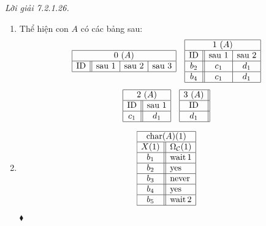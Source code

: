 \noindent\textit{Lời giải 7.2.1.26.}\keepwithnext
\begin{enumerate}[label=\alph*.]
\item Thể hiện con $A$ có các bảng sau:
\[
\begin{gathered}
\begin{array}{|c||c|c|c|}\hline\multicolumn{4}{|c|}{0\ (A)}\\\hline\text{ID}&\text{sau 1}&\text{sau 2}&\text{sau 3}\\\hline\end{array}\quad
\begin{array}{|c||c|c|}\hline\multicolumn{3}{|c|}{1\ (A)}\\\hline\text{ID}&\text{sau 1}&\text{sau 2}\\\hline
b_2&c_1&d_1\\\hline b_4&c_1&d_1\\\hline\end{array}\\[1ex]
\begin{array}{|c||c|}\hline\multicolumn{2}{|c|}{2\ (A)}\\\hline\text{ID}&\text{sau 1}\\\hline c_1&d_1\\\hline\end{array}\quad
\begin{array}{|c||}\hline3\ (A)\\\hline\text{ID}\\\hline d_1\\\hline\end{array}
\end{gathered}
\]
\item
\[
\begin{array}{|c||l|}\hline\multicolumn{2}{|c|}{\operatorname{char}(A)(1)}\\\hline
X(1)&\Omega_{\mathcal C}(1)\\\hline
b_1&\mathrm{wait}\,1\\\hline b_2&\mathrm{yes}\\\hline b_3&\mathrm{never}\\\hline b_4&\mathrm{yes}\\\hline b_5&\mathrm{wait}\,2\\\hline\end{array}
\]
\nobreak\hfill$\blacklozenge$
\end{enumerate}

